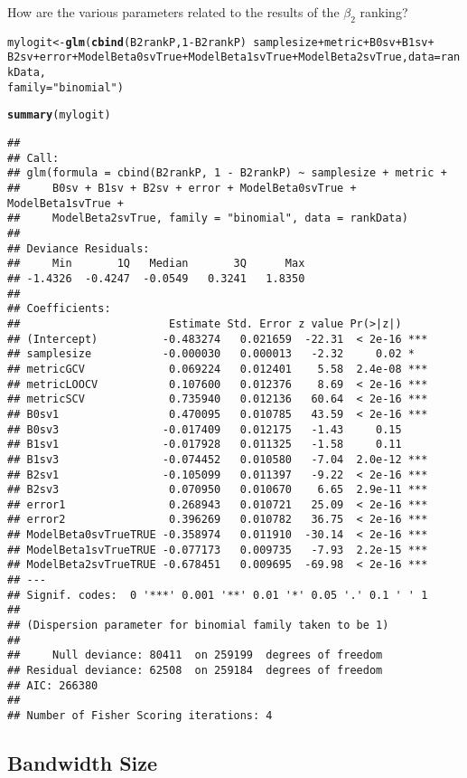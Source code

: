 \documentclass{article}\usepackage[]{graphicx}\usepackage[]{color}
\makeatletter
\newcommand{\hlnum}[1]{\textcolor[rgb]{0.686,0.059,0.569}{#1}}%
\newcommand{\hlstr}[1]{\textcolor[rgb]{0.192,0.494,0.8}{#1}}%
\newcommand{\hlopt}[1]{\textcolor[rgb]{0,0,0}{#1}}%
\newcommand{\hlstd}[1]{\textcolor[rgb]{0.345,0.345,0.345}{#1}}%
\newcommand{\hlkwb}[1]{\textcolor[rgb]{0.69,0.353,0.396}{#1}}%
\newcommand{\hlkwc}[1]{\textcolor[rgb]{0.333,0.667,0.333}{#1}}%
\newcommand{\hlkwd}[1]{\textcolor[rgb]{0.737,0.353,0.396}{\textbf{#1}}}%
\newenvironment{kframe}{%
 \def\at@end@of@kframe{}%
 \ifinner\ifhmode%
  \def\at@end@of@kframe{\end{minipage}}%
  \begin{minipage}{\columnwidth}%
 \fi\fi%
 \def\FrameCommand##1{\hskip\@totalleftmargin \hskip-\fboxsep
 \colorbox{shadecolor}{##1}\hskip-\fboxsep
     \hskip-\linewidth \hskip-\@totalleftmargin \hskip\columnwidth}%
 \MakeFramed {\advance\hsize-\width
   \@totalleftmargin\z@ \linewidth\hsize
   \@setminipage}}%
 {\par\unskip\endMakeFramed%
 \at@end@of@kframe}
\newenvironment{knitrout}{}{} %
\makeatother
\begin{document}
How are the various parameters related to the results of the $\beta _2$ ranking?
\begin{knitrout}
\color{fgcolor}\begin{kframe}
\begin{alltt}
\hlstd{mylogit} \hlkwb{<-} \hlkwd{glm}\hlstd{(}\hlkwd{cbind}\hlstd{(B2rankP,} \hlnum{1} \hlopt{-} \hlstd{B2rankP)} \hlopt{~} \hlstd{samplesize} \hlopt{+} \hlstd{metric} \hlopt{+} \hlstd{B0sv} \hlopt{+} \hlstd{B1sv} \hlopt{+}
    \hlstd{B2sv} \hlopt{+} \hlstd{error} \hlopt{+} \hlstd{ModelBeta0svTrue} \hlopt{+} \hlstd{ModelBeta1svTrue} \hlopt{+} \hlstd{ModelBeta2svTrue,} \hlkwc{data} \hlstd{= rankData,}
    \hlkwc{family} \hlstd{=} \hlstr{"binomial"}\hlstd{)}
\end{alltt}


{\ttfamily\noindent\color{warningcolor}{\#\# Warning: non-integer counts in a binomial glm!}}\begin{alltt}
\hlkwd{summary}\hlstd{(mylogit)}
\end{alltt}
\begin{verbatim}
## 
## Call:
## glm(formula = cbind(B2rankP, 1 - B2rankP) ~ samplesize + metric + 
##     B0sv + B1sv + B2sv + error + ModelBeta0svTrue + ModelBeta1svTrue + 
##     ModelBeta2svTrue, family = "binomial", data = rankData)
## 
## Deviance Residuals: 
##     Min       1Q   Median       3Q      Max  
## -1.4326  -0.4247  -0.0549   0.3241   1.8350  
## 
## Coefficients:
##                       Estimate Std. Error z value Pr(>|z|)    
## (Intercept)          -0.483274   0.021659  -22.31  < 2e-16 ***
## samplesize           -0.000030   0.000013   -2.32     0.02 *  
## metricGCV             0.069224   0.012401    5.58  2.4e-08 ***
## metricLOOCV           0.107600   0.012376    8.69  < 2e-16 ***
## metricSCV             0.735940   0.012136   60.64  < 2e-16 ***
## B0sv1                 0.470095   0.010785   43.59  < 2e-16 ***
## B0sv3                -0.017409   0.012175   -1.43     0.15    
## B1sv1                -0.017928   0.011325   -1.58     0.11    
## B1sv3                -0.074452   0.010580   -7.04  2.0e-12 ***
## B2sv1                -0.105099   0.011397   -9.22  < 2e-16 ***
## B2sv3                 0.070950   0.010670    6.65  2.9e-11 ***
## error1                0.268943   0.010721   25.09  < 2e-16 ***
## error2                0.396269   0.010782   36.75  < 2e-16 ***
## ModelBeta0svTrueTRUE -0.358974   0.011910  -30.14  < 2e-16 ***
## ModelBeta1svTrueTRUE -0.077173   0.009735   -7.93  2.2e-15 ***
## ModelBeta2svTrueTRUE -0.678451   0.009695  -69.98  < 2e-16 ***
## ---
## Signif. codes:  0 '***' 0.001 '**' 0.01 '*' 0.05 '.' 0.1 ' ' 1
## 
## (Dispersion parameter for binomial family taken to be 1)
## 
##     Null deviance: 80411  on 259199  degrees of freedom
## Residual deviance: 62508  on 259184  degrees of freedom
## AIC: 266380
## 
## Number of Fisher Scoring iterations: 4
\end{verbatim}
\end{kframe}
\end{knitrout}

\subsection{Bandwidth Size}

\newpage
\begin{singlespace}


\end{singlespace}
\end{document}
